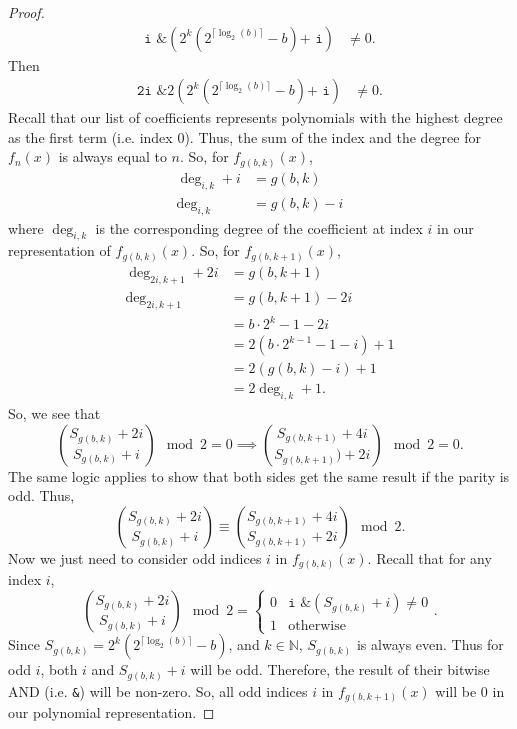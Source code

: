 \documentclass[a4paper]{article}
\newcommand{\N}{\mathbb{N}}
\begin{document}
\begin{proof}
\begin{align*}
			\texttt{i \& }\left(2^{k}\left(2^{\lceil\log_2{(b)}\rceil} - b\right)\texttt{+ i}\right) &\neq 0.
		\end{align*}
		Then
		\begin{align*}
			\texttt{2i \& }2\left(2^{k}\left(2^{\lceil\log_2{(b)}\rceil} - b\right)\texttt{+ i}\right) &\neq 0.
		\end{align*}
		Recall that our list of coefficients represents polynomials with the highest degree as the first term (i.e. index 0).
		Thus, the sum of the index and the degree for $f_n(x)$ is always equal to $n$.
		So, for $f_{g(b,k)}(x)$,
		\begin{align*}
			\deg_{i,k} + i &= g(b,k) \\
			\deg_{i,k} &= g(b,k) - i
		\end{align*}
		where $\deg_{i,k}$ is the corresponding degree of the coefficient at index $i$ in our representation of $f_{g(b,k)}(x)$.
		So, for $f_{g(b,k+1)}(x)$,
		\begin{align*}
			\deg_{2i,k+1} + 2i &= g(b,k+1) \\
			\deg_{2i,k+1} &= g(b,k+1) - 2i \\
			&= b\cdot2^{k} - 1 - 2i \\
			&= 2\left(b\cdot2^{k-1} - 1 - i\right) + 1 \\
			&= 2\left(g(b,k) - i\right) + 1 \\
			&= 2\deg_{i,k} + 1.
		\end{align*}
		So, we see that
		\begin{equation*}
			\binom{S_{g(b,k)} + 2i}{S_{g(b,k)} + i} \mod 2 = 0 \implies \binom{S_{g(b,k+1)} + 4i}{S_{g(b,k+1)}) + 2i} \mod 2 = 0.
		\end{equation*}
		The same logic applies to show that both sides get the same result if the parity is odd. Thus,
		\begin{equation*}
			\binom{S_{g(b,k)} + 2i}{S_{g(b,k)} + i} \equiv \binom{S_{g(b,k+1)} + 4i}{S_{g(b,k+1)} + 2i} \mod 2.
		\end{equation*}
		Now we just need to consider odd indices $i$ in $f_{g(b,k)}(x)$.
		Recall that for any index $i$,
		\begin{equation*}
			\binom{S_{g(b,k)} + 2i}{S_{g(b,k)} + i} \mod 2 =\begin{cases}
				0 & \texttt{i \& }\left(S_{g(b,k)} + i\right) \neq 0 \\
				1 & \text{otherwise}
			\end{cases}.
		\end{equation*}
		Since $S_{g(b,k)} = 2^k\left(2^{\lceil \log_2{(b)} \rceil} - b\right)$, and $k \in \N$,
		$S_{g(b,k)}$ is always even.
		Thus for odd $i$, both $i$ and $S_{g(b,k)} + i$ will be odd.
		Therefore, the result of their bitwise AND (i.e. \texttt{\&}) will be non-zero.
		So, all odd indices $i$ in $f_{g(b,k+1)}(x)$ will be 0 in our polynomial representation.
	\end{proof}
\end{document}
